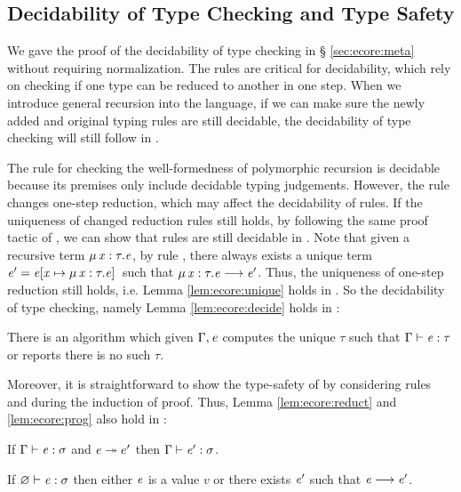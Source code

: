 \subsection{Decidability of Type Checking and Type Safety}
We gave the proof of the decidability of type checking \ecore in \S
\ref{sec:ecore:meta} without requiring normalization. The \cast rules
are critical for decidability, which rely on checking if one type can
be reduced to another in one step. When we introduce general recursion
into the language, if we can make sure the newly added and original
typing rules are still decidable, the decidability of type checking
will still follow in \name.

The rule  for checking the well-formedness of
polymorphic recursion is decidable because its premises only include
decidable typing judgements. However, the rule  changes
one-step reduction, which may affect the decidability of \cast
rules. If the uniqueness of changed reduction rules still holds, by
following the same proof tactic of \ecore, we can show that \cast
rules are still decidable in \name. Note that given a recursive term
$\mu \, \mathit{x}  :  \tau  .  \mathit{e}$, by rule , there always exists a unique
term $\mathit{e'}=\mathit{e}  [  \mathit{x}  \mapsto  \mu \, \mathit{x}  :  \tau  .  \mathit{e}  ] \,$ such that $\mu \, \mathit{x}  :  \tau  .  \mathit{e}  \longrightarrow  \mathit{e'}$. Thus, the uniqueness of one-step reduction still holds,
i.e. Lemma \ref{lem:ecore:unique} holds in \name. So the decidability
of type checking, namely Lemma \ref{lem:ecore:decide} holds in \name:

\begin{thm}\label{lem:rec:decide}
	There is an algorithm which given $\Gamma, \mathit{e}$ computes the unique
$\tau$ such that $\Gamma  \vdash  \mathit{e}  :  \tau$ or reports there is no such $\tau$.
\end{thm}

Moreover, it is straightforward to show the type-safety of \name by
considering rules  and  during the
induction of proof. Thus, Lemma \ref{lem:ecore:reduct} and \ref{lem:ecore:prog}
also hold in \name:

\begin{thm}\label{lem:rec:reduct}
If $\Gamma  \vdash  \mathit{e}  :  \sigma$ and $\mathit{e}  \twoheadrightarrow  e'$ then $\Gamma  \vdash  \mathit{e'}  :  \sigma$.
\end{thm}

\begin{thm}[Progress]\label{lem:rec:prog}
If $\varnothing  \vdash  \mathit{e}  :  \sigma$ then either $\mathit{e}$ is a value $v$ or there exists $\mathit{e}'$
such that $\mathit{e}  \longrightarrow  \mathit{e'}$.
\end{thm}
